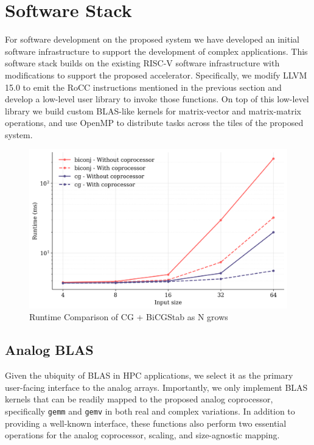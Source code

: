 \section{Software Stack}
For software development on the proposed system we have developed an initial software infrastructure to support the development of complex applications.
This software stack builds on the existing RISC-V software infrastructure with modifications to support the proposed accelerator.
Specifically, we modify LLVM 15.0 to emit the RoCC instructions mentioned in the previous section and develop a low-level user library to invoke those functions.
On top of this low-level library we build custom BLAS-like kernels for matrix-vector and matrix-matrix operations, and use OpenMP to distribute tasks across the tiles of the proposed system.  

\begin{figure}[ht]
\centering
\includegraphics[scale=0.42]{figures/with_without.png}
\vspace{-10pt}
\caption{Runtime Comparison of CG + BiCGStab as N grows}
\vspace{-10pt}
\label{fig:single}
\end{figure}

\subsection{Analog BLAS}
Given the ubiquity of BLAS in HPC applications, we select it as the primary user-facing interface to the analog arrays.
Importantly, we only implement BLAS kernels that can be readily mapped to the proposed analog coprocessor, specifically \texttt{gemm} and \texttt{gemv} in both real and complex variations.
In addition to providing a well-known interface, these functions also perform two essential operations for the analog coprocessor, scaling, and size-agnostic mapping.

